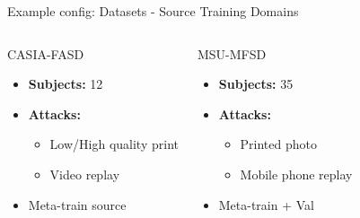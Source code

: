 \begin{frame}{Example config: Datasets - Source Training Domains}
    \begin{columns}[T]
        \begin{block}{CASIA-FASD}
            \begin{itemize}
                \item \textbf{Subjects:} 12
                \item \textbf{Attacks:} 
                    \begin{itemize}
                        \item Low/High quality print
                        \item Video replay
                    \end{itemize}
                \item {} Meta-train source
            \end{itemize}
        \end{block}

        \begin{block}{MSU-MFSD}
            \begin{itemize}
                \item \textbf{Subjects:} 35
                \item \textbf{Attacks:}
                    \begin{itemize}
                        \item Printed photo
                        \item Mobile phone replay
                    \end{itemize}
                \item {} Meta-train + Val
            \end{itemize}
        \end{block}
    \end{columns}
\end{frame}

